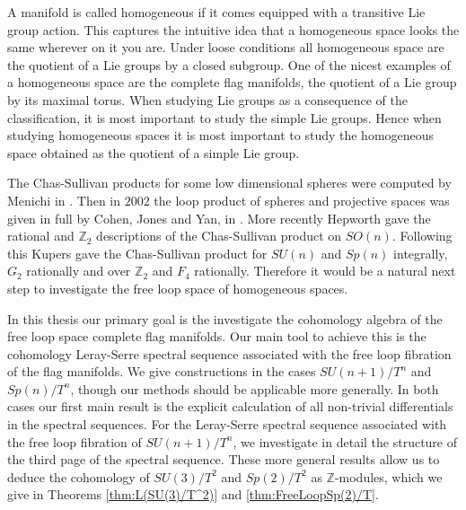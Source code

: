 \documentclass{article}
\theoremstyle{plain}
\theoremstyle{definition}
\numberwithin{thm}{section}
\begin{document}
			A manifold is called homogeneous if it comes equipped with a transitive Lie group action.
			This captures the intuitive idea that a homogeneous space looks the same wherever on it you are.
			Under loose conditions all homogeneous space are the quotient of a Lie groups by a closed subgroup.
			One of the nicest examples of a homogeneous space are the complete flag manifolds, the quotient of a Lie group by its maximal torus.
			When studying Lie groups as a consequence of the classification, it is most important to study the simple Lie groups.
			Hence when studying homogeneous spaces it is most important to study the homogeneous space obtained as the quotient of a simple Lie group.
			
			The Chas-Sullivan products for some low dimensional spheres were computed by Menichi in \cite{StringTop2006}.
			Then in $2002$ the loop product of spheres and projective spaces was given in full by Cohen, Jones and Yan, in \cite{loop_homology_spectral_sequence}.
			More recently Hepworth \cite{HepwothString} gave the rational and $\mathbb{Z}_2$ descriptions of the Chas-Sullivan product on $SO(n)$.
			Following this Kupers \cite{Kupers1010} gave the Chas-Sullivan product for $SU(n)$ and $Sp(n)$ integrally,
			$G_2$ rationally and over $\mathbb{Z}_2$ and $F_4$ rationally.
			Therefore it would be a natural next step to investigate the free loop space of homogeneous spaces.
			
			In this thesis our primary goal is the investigate the cohomology algebra of the free loop space complete flag manifolds.
			Our main tool to achieve this is the cohomology Leray-Serre spectral sequence associated with the free loop fibration of the flag manifolds.
			We give constructions in the cases $SU(n+1)/T^n$ and $Sp(n)/T^n$, though our methods should be applicable more generally.
			In both cases our first main result is the explicit calculation of all non-trivial differentials in the spectral sequences.
			For the Leray-Serre spectral sequence associated with the free loop fibration of $SU(n+1)/T^n$, we investigate in detail the structure of the third page
			of the spectral sequence.
			These more general results allow us to deduce the cohomology of $SU(3)/T^2$ and $Sp(2)/T^2$ as $\mathbb{Z}$-modules,
			which we give in Theorems \ref{thm:L(SU(3)/T^2)} and \ref{thm:FreeLoopSp(2)/T}.
			
\end{document}
